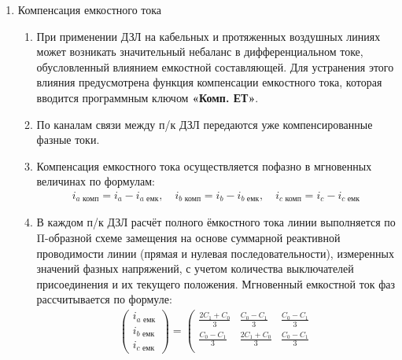 \begin{enumerate}
\item Компенсация емкостного тока
\begin{enumerate}
\item При применении ДЗЛ на кабельных и протяженных воздушных линиях может возникать значительный небаланс в дифференциальном токе, обусловленный влиянием емкостной составляющей. Для устранения этого влияния предусмотрена функция компенсации емкостного тока, которая вводится программным ключом \textbf{«Комп. ЕТ»}.
\item По каналам связи между п/к ДЗЛ передаются уже компенсированные фазные токи.
\item Компенсация емкостного тока осуществляется пофазно в мгновенных величинах по формулам:
  \begin{align}
    i_{\textit{a комп}} = i_{\textit{a}} - i_{\textit{a емк}}, \quad
    i_{\textit{b комп}} = i_{\textit{b}} - i_{\textit{b емк}}, \quad
    i_{\textit{c комп}} = i_{\textit{c}} - i_{\textit{c емк}}
  \end{align}
\item В каждом п/к ДЗЛ расчёт полного ёмкостного тока линии выполняется по Π-образной схеме замещения на основе суммарной реактивной проводимости линии (прямая и нулевая последовательности), измеренных значений фазных напряжений, с учетом количества выключателей присоединения и их текущего положения. Мгновенный емкостной ток фаз рассчитывается по формуле:
  \begin{align}
    \left(\begin{array}{c}i_{\textit{a емк}}\\ i_{\textit{b емк}}\\i_{\textit{c емк}}\end{array}\right)=
    \left(\begin{array}{ccc}
      \frac{2C_1+C_0}{3} & \frac{C_0-C_1}{3} & \frac{C_0-C_1}{3} \\
      \frac{C_0-C_1}{3} & \frac{2C_1+C_0}{3} & \frac{C_0-C_1}{3}\\

\end{array}
\end{align}
\end{enumerate}
\end{enumerate}
